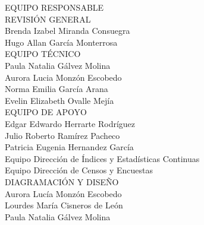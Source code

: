 {\Bold \LARGE EQUIPO RESPONSABLE}\\[2cm]
{\Bold \large \color{color1!89!black} REVISIÓN GENERAL}\\[0.2cm]
Brenda Izabel Miranda Consuegra\\
Hugo Allan García Monterrosa\\[0.8cm]
{\Bold \large \color{color1!89!black} EQUIPO TÉCNICO}\\[0.2cm]
Paula Natalia Gálvez Molina\\
Aurora Lucia Monzón Escobedo\\
Norma Emilia García Arana\\
Evelin Elizabeth Ovalle Mejía\\[0.8cm]
{\Bold \large \color{color1!89!black} EQUIPO DE APOYO}\\[0.2cm]
Edgar Edwardo Herrarte Rodríguez\\
Julio Roberto Ramírez Pacheco \\
Patricia Eugenia Hernandez García\\
Equipo Dirección de Índices y Estadísticas Continuas\\
Equipo Dirección de Censos y Encuestas\\[0.8cm]
{\Bold \large \color{color1!89!black} DIAGRAMACIÓN Y DISEÑO}\\[0.2cm]
Aurora Lucía Monzón Escobedo\\
Lourdes María Cisneros de León\\
Paula Natalia Gálvez Molina\\[0.8cm]
